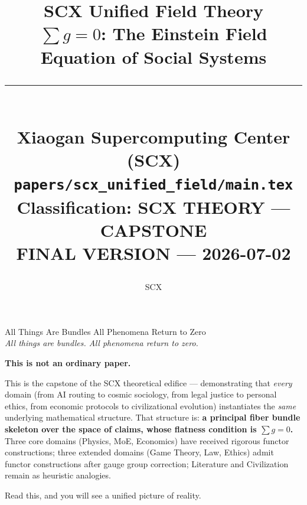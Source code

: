 \documentclass[12pt,a4paper]{article}
\title{
    \vspace{1.5cm}
    {\Huge \textbf{SCX Unified Field Theory}}\\[0.3cm]
    {\LARGE $\displaystyle\sum g = 0$: The Einstein Field Equation of Social Systems}\\[1cm]
    \rule{\textwidth}{1.5pt}\\[0.5cm]
    {\normalsize Xiaogan Supercomputing Center (SCX)}\\[0.2cm]
    {\small \texttt{papers/scx\_unified\_field/main.tex}}\\[0.2cm]
    {\small Classification: SCX THEORY — CAPSTONE}\\[0.2cm]
    {\small FINAL VERSION — 2026-07-02}
    \vspace{0.5cm}
}
\author{SCX}
\date{}
\theoremstyle{plain}
\theoremstyle{definition}
\begin{document}
\maketitle
\thispagestyle{empty}

\begin{center}

\vspace{0.5cm}
{\large \textcolor{scxblue}{All Things Are Bundles  All Phenomena Return to Zero}}\\[0.2cm]
{\normalsize \textit{All things are bundles. All phenomena return to zero.}}
\end{center}

\vspace{0.5cm}

\begin{scxbox}
\textbf{This is not an ordinary paper.}

This is the capstone of the SCX theoretical edifice — demonstrating that
\textit{every} domain (from AI routing to cosmic sociology, from legal justice
to personal ethics, from economic protocols to civilizational evolution) instantiates
the \textit{same} underlying mathematical structure.
That structure is: \textbf{a principal fiber bundle skeleton over the space of claims,
whose flatness condition is $\sum g = 0$.} Three core domains (Physics, MoE, Economics)
have received rigorous functor constructions; three extended domains (Game Theory,
Law, Ethics) admit functor constructions after gauge group correction;
Literature and Civilization remain as heuristic analogies.

Read this, and you will see a unified picture of reality.
\end{scxbox}
\end{document}
